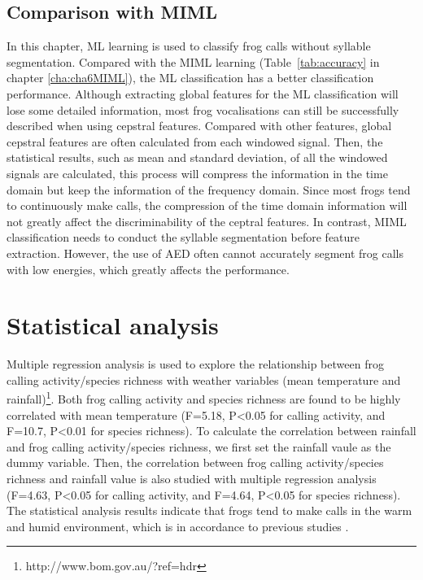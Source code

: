 \subsection{Comparison with MIML}
In this chapter, ML learning is used to classify frog calls without syllable segmentation. Compared with the MIML learning (Table~\ref{tab:accuracy} in chapter \ref{cha:cha6MIML}), the ML classification has a better classification performance. Although extracting global features for the ML classification will lose some detailed information, most frog vocalisations can still be successfully described when using cepstral features.
Compared with other features, global cepstral features are often calculated from each windowed signal. Then, the statistical results, such as mean and standard deviation, of all the windowed signals are calculated, this process will compress the information in the time domain but keep the information of the frequency domain. Since most frogs tend to continuously make calls, the compression of the time domain information will not greatly affect the discriminability of the ceptral features. In contrast, MIML classification needs to conduct the syllable segmentation before feature extraction. However, the use of AED often cannot accurately segment frog calls with low energies, which greatly affects the performance.








\section{Statistical analysis}
Multiple regression analysis is used to explore the relationship between frog calling activity/species richness with weather variables (mean temperature and rainfall)\footnote[5] {http://www.bom.gov.au/?ref=hdr}. Both frog calling activity and species richness are found to be highly correlated with mean temperature (F=5.18, P\textless0.05 for calling activity, and F=10.7, P\textless0.01 for species richness). To calculate the correlation between rainfall and frog calling activity/species richness, we first set the rainfall vaule as the dummy variable. Then, the correlation between frog calling activity/species richness and rainfall value is also studied with multiple regression analysis (F=4.63, P\textless0.05 for calling activity, and F=4.64, P\textless0.05 for species richness). The statistical analysis results indicate that frogs tend to make calls in the warm and humid environment, which is in accordance to previous studies \citep{akmentins2015patterns, canavero2008calling}.






